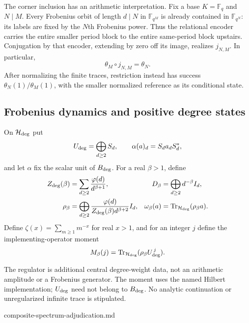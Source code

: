 The corner inclusion has an arithmetic interpretation. Fix a base
$K=\mathbb F_q$ and $N\mid M$. Every Frobenius orbit of length $d\mid N$
in $\mathbb F_{q^M}$ is already contained in $\mathbb F_{q^N}$: its labels
are fixed by the $N$th Frobenius power. Thus the relational encoder carries
the entire smaller period block to the entire same-period block upstairs.
Conjugation by that encoder, extending by zero off its image, realizes
$j_{N,M}$. In particular,
\[
 \theta_M\circ j_{N,M}=\theta_N.
\]
After normalizing the finite traces, restriction instead has success
$\theta_N(1)/\theta_M(1)$, with the smaller normalized reference as its
conditional state.

\subsection{Frobenius dynamics and positive degree states}

\begin{definition}
On $\mathcal H_{\rm deg}$ put
\[
 U_{\rm deg}=\bigoplus_{d\geq2}S_d,\qquad
 \alpha(a)_d=S_d a_d S_d^*,
\]
and let $\alpha$ fix the scalar unit of $B_{\rm deg}$.
For a real $\beta>1$, define
\begin{align*}
 Z_{\rm deg}(\beta)&=\sum_{d\geq2}\frac{\varphi(d)}{d^{\beta+1}},&
 D_\beta&=\bigoplus_{d\geq2}d^{-\beta}I_d,\\
 \rho_\beta&=\bigoplus_{d\geq2}
       \frac{\varphi(d)}{Z_{\rm deg}(\beta)d^{\beta+2}}I_d,&
 \omega_\beta(a)&=\operatorname{Tr}_{\mathcal H_{\rm deg}}(\rho_\beta a).
\end{align*}
Define $\zeta(x)=\sum_{m\geq1}m^{-x}$ for real $x>1$, and for an integer
$j$ define the implementing-operator moment
\[
 M_\beta(j)=\operatorname{Tr}_{\mathcal H_{\rm deg}}
                   (\rho_\beta U_{\rm deg}^{\,j}).
\]
\end{definition}
\begin{scope}
The regulator is additional central degree-weight data, not an arithmetic
amplitude or a Frobenius generator. The moment uses the named Hilbert
implementation; $U_{\rm deg}$ need not belong to $B_{\rm deg}$. No
analytic continuation or unregularized infinite trace is stipulated.
\end{scope}
{composite-spectrum-adjudication.md}

